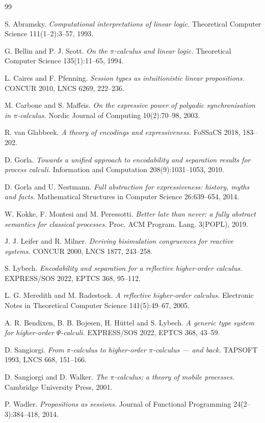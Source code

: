 \documentclass[11pt]{article}
\theoremstyle{definition}
\theoremstyle{plain}
\theoremstyle{remark}
\begin{document}
\begin{thebibliography}{99}

 S. Abramsky.
\emph{Computational interpretations of linear logic.}
Theoretical Computer Science 111(1--2):3--57, 1993.

 G. Bellin and P. J. Scott.
\emph{On the $\pi$-calculus and linear logic.}
Theoretical Computer Science 135(1):11--65, 1994.

 L. Caires and F. Pfenning.
\emph{Session types as intuitionistic linear propositions.}
CONCUR 2010, LNCS 6269, 222--236.

 M. Carbone and S. Maffeis.
\emph{On the expressive power of polyadic synchronisation in $\pi$-calculus.}
Nordic Journal of Computing 10(2):70--98, 2003.

 R. van Glabbeek.
\emph{A theory of encodings and expressiveness.}
FoSSaCS 2018, 183--202.

 D. Gorla.
\emph{Towards a unified approach to encodability and separation results
for process calculi.}
Information and Computation 208(9):1031--1053, 2010.

 D. Gorla and U. Nestmann.
\emph{Full abstraction for expressiveness: history, myths and facts.}
Mathematical Structures in Computer Science 26:639--654, 2014.

 W. Kokke, F. Montesi and M. Peressotti.
\emph{Better late than never: a fully abstract semantics for classical
processes.}
Proc. ACM Program. Lang. 3(POPL), 2019.

 J. J. Leifer and R. Milner.
\emph{Deriving bisimulation congruences for reactive systems.}
CONCUR 2000, LNCS 1877, 243--258.

 S. Lybech.
\emph{Encodability and separation for a reflective higher-order calculus.}
EXPRESS/SOS 2022, EPTCS 368, 95--112.

 L. G. Meredith and M. Radestock.
\emph{A reflective higher-order calculus.}
Electronic Notes in Theoretical Computer Science 141(5):49--67, 2005.

 A. R. Bendixen, B. B. Bojesen, H. H\"uttel and S. Lybech.
\emph{A generic type system for higher-order $\Psi$-calculi.}
EXPRESS/SOS 2022, EPTCS 368, 43--59.

 D. Sangiorgi.
\emph{From $\pi$-calculus to higher-order $\pi$-calculus --- and back.}
TAPSOFT 1993, LNCS 668, 151--166.

 D. Sangiorgi and D. Walker.
\emph{The $\pi$-calculus: a theory of mobile processes.}
Cambridge University Press, 2001.

 P. Wadler.
\emph{Propositions as sessions.}
Journal of Functional Programming 24(2--3):384--418, 2014.

\end{thebibliography}
\end{document}

